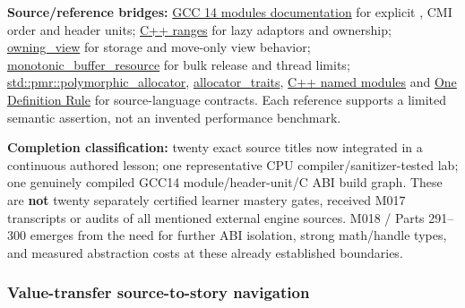 \textbf{Source/reference bridges:} \href{https://gcc.gnu.org/onlinedocs/gcc-14.3.0/gcc/C_002b_002b-Modules.html}{GCC 14 modules documentation} for explicit , CMI order and header units; \href{https://en.cppreference.com/cpp/ranges}{C++ ranges} for lazy adaptors and ownership; \href{https://en.cppreference.com/cpp/ranges/owning_view}{owning\_view} for storage and move-only view behavior; \href{https://en.cppreference.com/cpp/memory/monotonic_buffer_resource}{monotonic\_buffer\_resource} for bulk release and thread limits; \href{https://en.cppreference.com/w/cpp/memory/polymorphic_allocator}{std::pmr::polymorphic\_allocator}, \href{https://en.cppreference.com/w/cpp/memory/allocator_traits}{allocator\_traits}, \href{https://en.cppreference.com/w/cpp/language/modules}{C++ named modules} and \href{https://en.cppreference.com/w/cpp/language/definition}{One Definition Rule} for source-language contracts. Each reference supports a limited semantic assertion, not an invented performance benchmark.

\textbf{Completion classification:} twenty exact source titles now integrated in a continuous authored lesson; one representative CPU compiler/sanitizer-tested lab; one genuinely compiled GCC14 module/header-unit/C ABI build graph. These are \textbf{not} twenty separately certified learner mastery gates, received M017 transcripts or audits of all mentioned external engine sources. M018 / Parts 291--300 emerges from the need for further ABI isolation, strong math/handle types, and measured abstraction costs at these already established boundaries.

\subsubsection{Value-transfer source-to-story navigation}\label{appendix-fd090d982a15-value-transfer-source-to-story-navigation}

\hypertarget{appendix-fd090d982a15-value-transfer-source-to-story-navigation}{}

